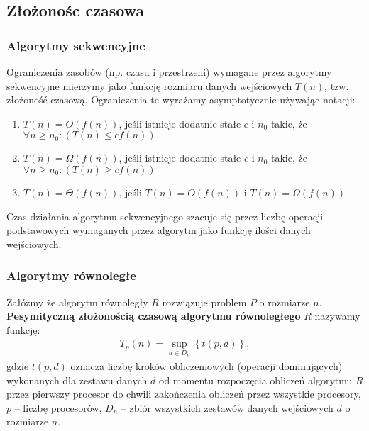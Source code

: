 \subsection{Złożonośc czasowa}
\label{subsec:algorytmy_sekwencyjne}
\subsubsection{Algorytmy sekwencyjne}

Ograniczenia zasobów (np. czasu i przestrzeni) wymagane przez algorytmy sekwencyjne mierzymy jako funkcję rozmiaru danych wejściowych \(T(n)\), tzw. złożoność czasową. Ograniczenia te wyrażamy asymptotycznie używając notacji:

\begin{enumerate}
\item{\(T(n) = O(f(n))\), jeśli istnieje dodatnie stałe \(c\) i \(n_0\) takie, że \(\forall{n \geq n_0}: (T(n)\leq cf(n)) \)}
\item{\(T(n) = \Omega(f(n))\), jeśli istnieje dodatnie stałe \(c\) i \(n_0\) takie, że \(\forall{n \geq n_0}: (T(n)\geq cf(n)) \)}
\item{\(T(n) = \Theta(f(n))\), jeśli \(T(n)=O(f(n))\) i \(T(n)=\Omega(f(n))\)}
\end{enumerate}
Czas działania algorytmu sekwencyjnego szacuje się przez liczbę operacji podstawowych wymaganych przez algorytm jako funkcję ilości danych wejściowych.
\subsubsection{Algorytmy równoległe}

\begin{definicja}\label{def:pesymistyczna_zlozonosc_czasowa}
Załóżmy że algorytm równoległy \(R\) rozwiązuje problem \(P\) o rozmiarze \(n\). \textbf{Pesymityczną złożonością czasową algorytmu równoległego} \(R\) nazywamy funkcję:\\
\begin{align}
T_{p}(n) = \sup_{d\in{D_n}}{\left\{t(p,d)\right\}},
\end{align}
gdzie \(t(p,d)\) oznacza liczbę kroków obliczeniowych (operacji dominujących) wykonanych dla zestawu danych \(d\) od momentu rozpoczęcia obliczeń algorytmu \(R\) przez pierwszy procesor do chwili zakończenia obliczeń przez wszystkie procesory, \(p\) -- liczbę procesorów, \(D_n\) -- zbiór wszystkich zestawów danych wejściowych \(d\) o rozmiarze \(n\).
\end{definicja}

